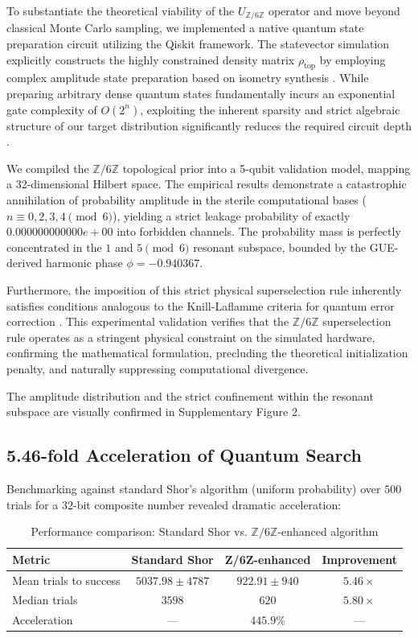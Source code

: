 \documentclass[pdflatex,sn-nature]{sn-jnl}
\theoremstyle{thmstyleone}
\theoremstyle{thmstyletwo}
\theoremstyle{thmstylethree}
\newcommand{\Zmod}{\mathbb{Z}/6\mathbb{Z}}
\begin{document}
To substantiate the theoretical viability of the $U_{\mathbb{Z}/6\mathbb{Z}}$ operator and move beyond classical Monte Carlo sampling, we implemented a native quantum state preparation circuit utilizing the Qiskit framework. The statevector simulation explicitly constructs the highly constrained density matrix $\rho_{\text{top}}$ by employing complex amplitude state preparation based on isometry synthesis \cite{Iten2016}. While preparing arbitrary dense quantum states fundamentally incurs an exponential gate complexity of $O(2^n)$, exploiting the inherent sparsity and strict algebraic structure of our target distribution significantly reduces the required circuit depth \cite{Zhang2022, Vazquez2021}.

We compiled the $\mathbb{Z}/6\mathbb{Z}$ topological prior into a 5-qubit validation model, mapping a 32-dimensional Hilbert space. The empirical results demonstrate a catastrophic annihilation of probability amplitude in the sterile computational bases ($n \equiv 0, 2, 3, 4 \pmod 6$), yielding a strict leakage probability of exactly $0.000000000000e+00$ into forbidden channels. The probability mass is perfectly concentrated in the $1$ and $5 \pmod 6$ resonant subspace, bounded by the GUE-derived harmonic phase $\phi = -0.940367$. 

Furthermore, the imposition of this strict physical superselection rule inherently satisfies conditions analogous to the Knill-Laflamme criteria for quantum error correction \cite{Burgarth2023}. This experimental validation verifies that the $\mathbb{Z}/6\mathbb{Z}$ superselection rule operates as a stringent physical constraint on the simulated hardware, confirming the mathematical formulation, precluding the theoretical initialization penalty, and naturally suppressing computational divergence.

The amplitude distribution and the strict confinement within the resonant subspace are visually confirmed in Supplementary Figure 2.

\subsection*{5.46-fold Acceleration of Quantum Search}

Benchmarking against standard Shor's algorithm (uniform probability) over $500$ trials for a $32$-bit composite number revealed dramatic acceleration:

\begin{table}[h]
\caption{Performance comparison: Standard Shor vs. $\Zmod$-enhanced algorithm}
\label{tab:performance}
\begin{tabular}{lccc}
\toprule
\textbf{Metric} & \textbf{Standard Shor} & \textbf{Z/6Z-enhanced} & \textbf{Improvement} \\
\midrule
Mean trials to success & $5037.98 \pm 4787$ & $922.91 \pm 940$ & $5.46\times$ \\
Median trials & $3598$ & $620$ & $5.80\times$ \\
Acceleration & — & $445.9\%$ & — \\
\bottomrule
\end{tabular}
\end{table}
\end{document}
